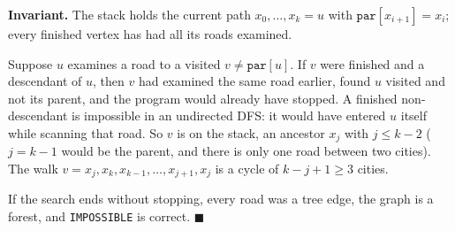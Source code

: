 \begin{invariantbox}
\textbf{Invariant.} The stack holds the current path $x_0, \dots, x_k = u$ with $\texttt{par}[x_{i+1}] = x_i$; every finished vertex has had all its roads examined.

Suppose $u$ examines a road to a visited $v \ne \texttt{par}[u]$. If $v$ were finished and a descendant of $u$, then $v$ had examined the same road earlier, found $u$ visited and not its parent, and the program would already have stopped. A finished non-descendant is impossible in an undirected DFS: it would have entered $u$ itself while scanning that road. So $v$ is on the stack, an ancestor $x_j$ with $j \le k - 2$ ($j = k-1$ would be the parent, and there is only one road between two cities). The walk $v = x_j, x_k, x_{k-1}, \dots, x_{j+1}, x_j$ is a cycle of $k - j + 1 \ge 3$ cities.

If the search ends without stopping, every road was a tree edge, the graph is a forest, and \texttt{IMPOSSIBLE} is correct. \hfill$\blacksquare$
\end{invariantbox}

